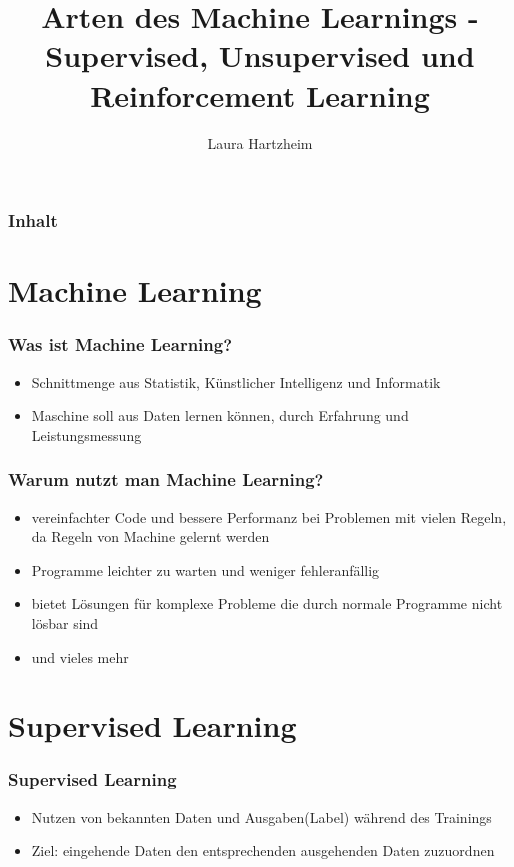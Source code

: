 \documentclass[11pt]{beamer}
\author{Laura Hartzheim}
\title{Arten des Machine Learnings - Supervised, Unsupervised und Reinforcement Learning}
\subtitle{}
\institute{}
\date{}
\begin{document}
	
	
	\begin{frame}
		\titlepage
	\end{frame} 
	
	\begin{frame}
		\frametitle{Inhalt}
		\tableofcontents
	\end{frame} 
	
	\section{Machine Learning}
	\begin{frame}
		\frametitle{Was ist Machine Learning?}
		\begin{itemize}
			\item Schnittmenge aus Statistik, Künstlicher Intelligenz und Informatik
			\item Maschine soll aus Daten lernen können, durch Erfahrung und Leistungsmessung
		\end{itemize} 
	\end{frame}
	
	\begin{frame}
		\frametitle{Warum nutzt man Machine Learning?}
		\begin{itemize}
			\item vereinfachter Code und bessere Performanz bei Problemen mit vielen Regeln, da Regeln von Machine gelernt werden 
			\item Programme leichter zu warten und weniger fehleranfällig
			\item bietet Lösungen für komplexe Probleme die durch normale Programme nicht lösbar sind
			\item und vieles mehr
			
		\end{itemize} 
	\end{frame}
	
	\section{Supervised Learning}
	
	\begin{frame}
		\frametitle{Supervised Learning}
		\begin{itemize}
			\item Nutzen von bekannten Daten und Ausgaben(Label) während des Trainings 
			\item Ziel: eingehende Daten den entsprechenden ausgehenden Daten zuzuordnen
		\end{itemize}
	\end{frame}
	
\end{document}
